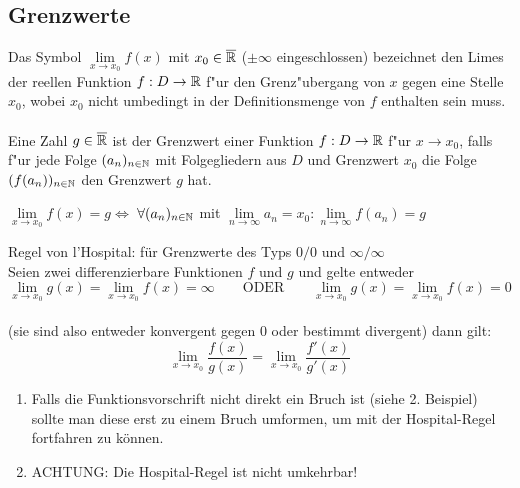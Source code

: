 \documentclass[../MAIN/main.tex]{subfiles}
\begin{document}
\subsection{Grenzwerte}

\begin{Definition}
Das Symbol $\lim\limits_{x \rightarrow x_{0}}f(x)$ mit $x_{0} \in \overline{\mathbb{R}}$ ($\pm \infty$ eingeschlossen) bezeichnet den Limes der reellen Funktion $f:D\rightarrow \mathbb{R}$ f"ur den Grenz"ubergang von $x$ gegen eine Stelle $x_{0}$, wobei $x_{0}$ nicht umbedingt in der Definitionsmenge von $f$ enthalten sein muss.\\
\\
Eine Zahl $g \in \overline{\mathbb{R}}$ ist der Grenzwert einer Funktion $f:D\rightarrow \mathbb{R}$ f"ur $x\rightarrow x_{0}$, falls f"ur jede Folge $(a_{n})_{n\in \mathbb{N}}$ mit Folgegliedern aus $D$ und Grenzwert $x_{0}$ die Folge $(f(a_{n}))_{n\in \mathbb{N}}$ den Grenzwert $g$ hat.
\begin{center}
$\lim\limits_{x \rightarrow x_{0}}f(x) = g $\quad $\Leftrightarrow$ \quad $\forall (a_{n})_{n\in \mathbb{N}}$ mit $\lim\limits_{n \rightarrow \infty}a_{n}=x_{0} : \lim\limits_{n \rightarrow \infty}f(a_{n})=g$
\end{center}
\end{Definition}

\begin{Theorem}
	Regel von l'Hospital: für Grenzwerte des Typs $0/0$ und $\infty/\infty$\\
	Seien zwei differenzierbare Funktionen $f$ und $g$ und gelte entweder\\
	$$\lim\limits_{x \rightarrow x_{0}}g(x) = \lim\limits_{x \rightarrow x_{0}}f(x) = \infty \qquad \text{ODER} \qquad  \lim\limits_{x \rightarrow x_{0}}g(x) = \lim\limits_{x \rightarrow x_{0}}f(x) = 0$$\\
	(sie sind also entweder konvergent gegen $0$ oder bestimmt divergent) dann gilt:\\
	$$\lim\limits_{x \rightarrow x_{0}} \dfrac{f(x)}{g(x)} = \lim\limits_{x \rightarrow x_{0}}\dfrac{f'(x)}{g'(x)}$$
\end{Theorem}

\begin{Bemerkung}
	\begin{enumerate}
		\item Falls die Funktionsvorschrift nicht direkt ein Bruch ist (siehe 2. Beispiel) sollte man diese erst zu einem Bruch umformen, um mit der Hospital-Regel fortfahren zu können.
		\item ACHTUNG: Die Hospital-Regel ist nicht umkehrbar!
	\end{enumerate}
\end{Bemerkung}
\end{document}

